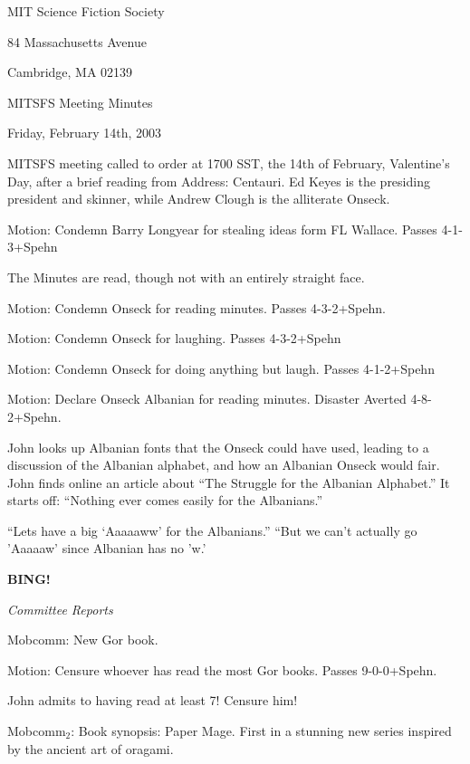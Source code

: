 \documentclass[12pt]{article}
\newcommand{\bing}{{\bf BING!} }
\newcommand{\goto}[1]{\bing \vskip 12pt \centerline{{\em{#1}}}}
\begin{document}
\begin{center}

MIT Science Fiction Society 

84 Massachusetts Avenue

Cambridge, MA 02139

\vspace{12pt}

MITSFS Meeting Minutes 

Friday, February 14th, 2003

\end{center}
 
\vspace{18pt}

\setlength{\parskip}{6pt}

\noindent
MITSFS meeting called to order at 1700 SST, the 14th of February, Valentine's Day, after a brief reading from Address: Centauri.  Ed Keyes is the presiding president and skinner, while Andrew Clough is the alliterate Onseck.

Motion:  Condemn Barry Longyear for stealing ideas form FL Wallace.  Passes 4-1-3+Spehn

The Minutes are read, though not with an entirely straight face.

Motion:  Condemn Onseck for reading minutes.  Passes 4-3-2+Spehn.

Motion:  Condemn Onseck for laughing.  Passes 4-3-2+Spehn

Motion:  Condemn Onseck for doing anything but laugh.  Passes 4-1-2+Spehn

Motion:  Declare Onseck Albanian for reading minutes.  Disaster Averted 4-8-2+Spehn.

John looks up Albanian fonts that the Onseck could have used, leading to a discussion of the Albanian alphabet, and how an Albanian Onseck would fair.  John finds online an article about ``The Struggle for the Albanian Alphabet.''  It starts off:  ``Nothing ever comes easily for the Albanians.''

``Lets have a big `Aaaaaww' for the Albanians.''  ``But we can't actually go 'Aaaaaw' since Albanian has no 'w.'

\goto{Committee Reports}

Mobcomm:  New Gor book.

Motion:  Censure whoever has read the most Gor books.  Passes 9-0-0+Spehn.

John admits to having read at least 7!  Censure him!

Mobcomm$_2$:  Book synopsis: Paper Mage.  First in a stunning new series inspired by the ancient art of oragami.
\end{document}
